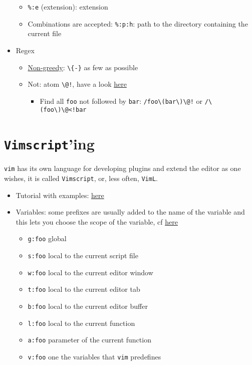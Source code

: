 \documentclass[a4paper,12pt,%
              final%
              ]{article}
\newcommand{\vim}{\texttt{vim}}
\newcommand{\vimscript}{\texttt{Vimscript}}
\begin{document}
\begin{itemize}
\begin{itemize}
      \item \verb|%:e| (extension): extension
      \item Combinations are accepted: \verb|%:p:h|: path to the directory containing the current file
    \end{itemize}
  \item Regex
    \begin{itemize}
      \item \href{http://vimregex.com/#Non-Greedy}{Non-greedy}: \verb|\{-}| as few as possible
      \item Not: atom \verb|\@!|, have a look \href{https://vim.fandom.com/wiki/Search_for_lines_not_containing_pattern_and_other_helpful_searches}{here}
        \begin{itemize}
          \item Find all \texttt{foo} not followed by \texttt{bar}: \verb|/foo\(bar\)\@!| or \verb|/\(foo\)\@<!bar|
        \end{itemize}
    \end{itemize}
\end{itemize}
%
\section{\vimscript{}'ing}
\vim{} has its own language for developing plugins and extend the editor as one wishes, it is called \vimscript{}, or, less often, \texttt{VimL}.
\begin{itemize}
  \item Tutorial with examples: \href{https://learnvimscriptthehardway.stevelosh.com/}{here}
  \item Variables: some prefixes are usually added to the name of the variable and this lets you choose the scope of the variable, cf \href{https://developer.ibm.com/articles/l-vim-script-1/#values-and-variables}{here}
    \begin{itemize}
      \item \texttt{g:foo} global
      \item \texttt{s:foo} local to the current script file
      \item \texttt{w:foo} local to the current editor window
      \item \texttt{t:foo} local to the current editor tab
      \item \texttt{b:foo} local to the current editor buffer
      \item \texttt{l:foo} local to the current function
      \item \texttt{a:foo} parameter of the current function
      \item \texttt{v:foo} one the variables that \vim{} predefines
    \end{itemize}
\end{itemize}
\end{document}
